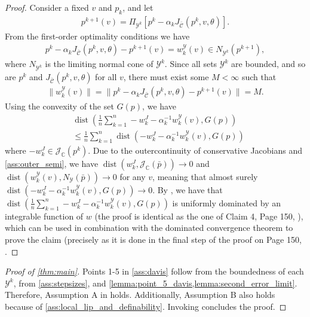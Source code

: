 \documentclass[journal,twoside,web,final]{ieeecolor}
\theoremstyle{definition}
\newcommand{\J}{\mathcal{J}}
\newcommand{\C}{\mathbb{C}}
\newcommand{\Cb}{{\bar{\mathcal{C}}}}
\begin{document}
\begin{proof}
Consider a fixed $v$ and $p_k$, and let
\begin{align*}
p^{k+1}(v)=\Pi_{\mathcal{Y}^k}[p^k-\alpha_k J_\Cb(p^k,v,\theta)]. 
\end{align*}
From the first-order optimality conditions we have
\begin{align*}
p^k - \alpha_k J_\Cb(p^k,v,\theta) - p^{k+1}(v)=w_k^\mathcal{Y}(v)\in N_{\mathcal{Y}^k}(p^{k+1}),
\end{align*}
where $N_{\mathcal{Y}^k}$ is the limiting normal cone of $\mathcal{Y}^k$.
Since all sets $\mathcal{Y}^k$ are bounded, and so are $p^k$ and $J_\Cb(p^k,v,\theta)$ for all $v$, there must exist some $M< \infty$ such that
\begin{align*}
\|w_k^\mathcal{Y}(v)\| = \|p^k - \alpha_k J_\Cb(p^k,v,\theta) - p^{k+1}(v)\| = M.
\end{align*}
Using the convexity of the set $G(p)$, we have
\begin{align*}
& \operatorname*{dist}\left( \frac{1}{n} \sum_{k=1}^{n}  -w_k^J - \alpha_k^{-1} w_k^\mathcal{Y}(v), G(p) \right) \\
& \leq \frac{1}{n} \sum_{k=1}^{n} \operatorname*{dist}\left( -w_k^J \! - \! \alpha_k^{-1} w_k^\mathcal{Y}(v), G(p) \right)
\end{align*}
where $-w_k^J\in \J_\C(p^k)$. Due to the outercontinuity of conservative Jacobians and \cref{ass:outer_semi}, we have $\operatorname*{dist}(w_k^J,\J_\C(\bar{p}))\to 0$ and $\operatorname*{dist}(w_k^{\mathcal{Y}}(v),N_\mathcal{Y}(\bar{p}))\to 0$ for any $v$, meaning that almost surely $\operatorname*{dist}( -w_k^J - \alpha_k^{-1} w_k^\mathcal{Y}(v), G(p) ) \to 0$.
By \cite[Lemma A.1]{davis2020stochastic}, we have that $\operatorname*{dist}\left( \frac{1}{n} \sum_{k=1}^{n}  -w_k^J - \alpha_k^{-1} w_k^\mathcal{Y}(v), G(p) \right)$ is uniformly dominated by an integrable function of $w$ (the proof is identical as the one of Claim 4, Page 150, \cite{davis2020stochastic}), which can be used in combination with the dominated convergence theorem to prove the claim (precisely as it is done in the final step of the proof on Page 150, \cite{davis2020stochastic}.
\end{proof}
%
\begin{proof}[Proof of \cref{thm:main}]
Points 1-5 in \cref{ass:davis} follow from the boundedness of each $\mathcal{Y}^k$, from \cref{ass:stepsizes}, and \cref{lemma:point_5_davis,lemma:second_error_limit}.
Therefore, Assumption A in \cite{davis2020stochastic} holds.
Additionally, Assumption B also holds because of \cref{ass:local_lip_and_definability}.
Invoking \cite[Theorem 1]{davis2020stochastic} concludes the proof.
\end{proof}
\end{document}
